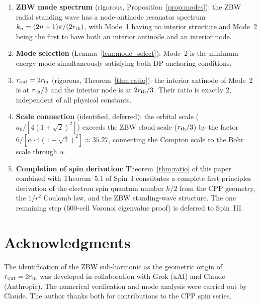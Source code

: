 \documentclass[12pt]{article}
\newcommand{\rth}{r_{\rm th}}
\newcommand{\rin}{r_{\rm in}}
\newcommand{\rout}{r_{\rm out}}
\newcommand{\aBohr}{a_0}
\begin{document}
\begin{enumerate}
  \item \textbf{ZBW mode spectrum} (rigorous,
    Proposition~\ref{prop:modes}): the ZBW radial standing wave
    has a node-antinode resonator spectrum
    $k_n = (2n-1)\pi/(2\rth)$, with Mode~1 having no interior
    structure and Mode~2 being the first to have both an interior
    antinode and an interior node.

  \item \textbf{Mode selection} (Lemma~\ref{lem:mode_select}):
    Mode~2 is the minimum-energy mode simultaneously satisfying
    both DP anchoring conditions.

  \item \textbf{$\rout = 2\rin$} (rigorous, Theorem~\ref{thm:ratio}):
    the interior antinode of Mode~2 is at $\rth/3$ and the interior
    node is at $2\rth/3$.  Their ratio is exactly 2, independent of
    all physical constants.

  \item \textbf{Scale connection} (identified, deferred): the orbital
    scale ($\aBohr/[4(1+\sqrt{2})^2]$) exceeds the ZBW cloud scale
    ($\rth/3$) by the factor $6/[\alpha\cdot 4(1+\sqrt{2})^2] \approx
    35.27$, connecting the Compton scale to the Bohr scale through
    $\alpha$.

  \item \textbf{Completion of spin derivation}: Theorem~\ref{thm:ratio}
    of this paper combined with Theorem~5.1 of Spin~I constitutes a
    complete first-principles derivation of the electron spin quantum
    number $\hbar/2$ from the CPP geometry, the $1/r^2$ Coulomb law,
    and the ZBW standing-wave structure.  The one remaining step
    (600-cell Voronoi eigenvalue proof) is deferred to Spin~III.
\end{enumerate}

\section*{Acknowledgments}

The identification of the ZBW sub-harmonic as the geometric origin of
$\rout = 2\rin$ was developed in collaboration with Grok (xAI) and
Claude (Anthropic).  The numerical verification and mode analysis were
carried out by Claude.  The author thanks both for contributions to the
CPP spin series.
\end{document}
